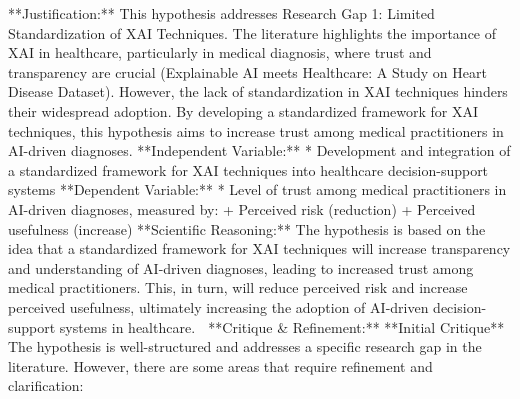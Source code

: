 \documentclass{article}%
\begin{document}
\newline%
**Justification:**\newline%
\newline%
This hypothesis addresses Research Gap 1: Limited Standardization of XAI Techniques. The literature highlights the importance of XAI in healthcare, particularly in medical diagnosis, where trust and transparency are crucial (Explainable AI meets Healthcare: A Study on Heart Disease Dataset). However, the lack of standardization in XAI techniques hinders their widespread adoption. By developing a standardized framework for XAI techniques, this hypothesis aims to increase trust among medical practitioners in AI{-}driven diagnoses.\newline%
\newline%
**Independent Variable:**\newline%
\newline%
* Development and integration of a standardized framework for XAI techniques into healthcare decision{-}support systems\newline%
\newline%
**Dependent Variable:**\newline%
\newline%
* Level of trust among medical practitioners in AI{-}driven diagnoses, measured by:\newline%
	+ Perceived risk (reduction)\newline%
	+ Perceived usefulness (increase)\newline%
\newline%
**Scientific Reasoning:**\newline%
\newline%
The hypothesis is based on the idea that a standardized framework for XAI techniques will increase transparency and understanding of AI{-}driven diagnoses, leading to increased trust among medical practitioners. This, in turn, will reduce perceived risk and increase perceived usefulness, ultimately increasing the adoption of AI{-}driven decision{-}support systems in healthcare.  \newline%
\newline%
🔹 **Critique \& Refinement:**  \newline%
**Initial Critique**\newline%
\newline%
The hypothesis is well{-}structured and addresses a specific research gap in the literature. However, there are some areas that require refinement and clarification:\newline%
\end{document}
